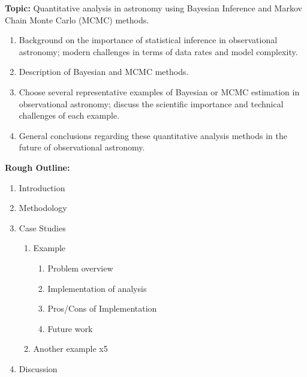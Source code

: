 \documentclass[12pt]{article}
\begin{document}
\noindent \textbf{Topic:} Quantitative analysis in astronomy using Bayesian Inference and Markov Chain Monte Carlo (MCMC) methods.

\begin{enumerate}
  \item Background on the importance of statistical inference in observational astronomy; modern challenges in terms of data rates and model complexity.
  \item Description of Bayesian and MCMC methods.
  \item Choose several representative examples of Bayesian or MCMC estimation in observational astronomy; discuss the scientific importance and technical challenges of each example.
  \item General conclusions regarding these quantitative analysis methods in the future of observational astronomy.
\end{enumerate}

\noindent \textbf{Rough Outline:}

\begin{enumerate}
  \item Introduction
  \item Methodology
  \item Case Studies
  \begin{enumerate}
    \item Example
    \begin{enumerate}
      \item Problem overview
      \item Implementation of analysis
      \item Pros/Cons of Implementation
      \item Future work
    \end{enumerate}
    \item Another example x5
  \end{enumerate}
  \item Discussion
\end{enumerate}
\end{document}
